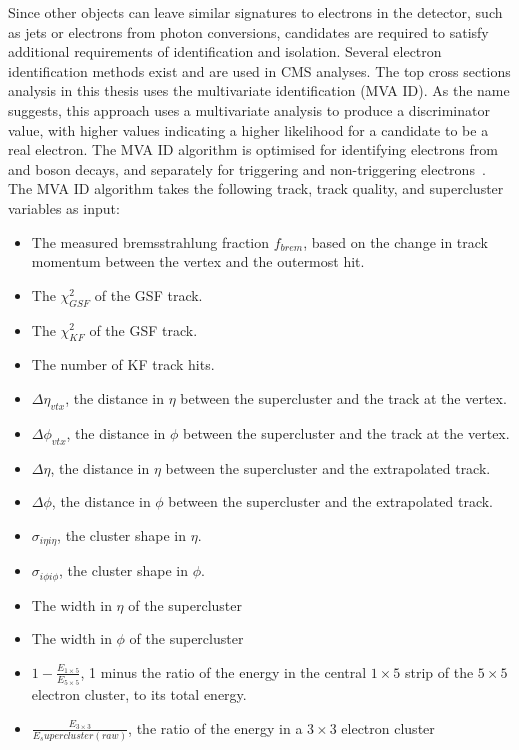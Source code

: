 Since other objects can leave similar signatures to electrons in the detector, such as jets or electrons from
photon conversions, candidates are required to satisfy additional requirements of identification and
isolation. Several electron identification methods exist and are used in CMS analyses. The top cross sections
analysis in this thesis uses the multivariate identification (MVA ID). As the name suggests, this approach
uses a multivariate analysis to produce a discriminator value, with higher values indicating a higher
likelihood for a candidate to be a real electron. The MVA ID algorithm is optimised for identifying electrons
from \W and \Z boson decays, and separately for triggering and non-triggering
electrons~\cite{electron_reconstruction}. The MVA ID algorithm takes the following track, track quality, and
supercluster variables as input:
\begin{itemize}
  \item The measured bremsstrahlung fraction $f_{brem}$, based on the change in track momentum between the
  vertex and the outermost hit.
  \item The $\chi^{2}_{GSF}$ of the GSF track.
  \item The $\chi^{2}_{KF}$ of the GSF track.
  \item The number of KF track hits.
  \item $\Delta\eta_{vtx}$, the distance in $\eta$ between the supercluster and the track at the vertex.
  \item $\Delta\phi_{vtx}$, the distance in $\phi$ between the supercluster and the track at the vertex.
  \item $\Delta\eta$, the distance in $\eta$ between the supercluster and the extrapolated track.
  \item $\Delta\phi$, the distance in $\phi$ between the supercluster and the extrapolated track.
  \item $\sigma_{i\eta i\eta}$, the cluster shape in $\eta$. 
  \item $\sigma_{i\phi i\phi}$, the cluster shape in $\phi$.
  \item The width in $\eta$ of the supercluster
  \item The width in $\phi$ of the supercluster
  \item $1-\frac{E_{1\times5}}{E_{5\times5}}$, 1 minus the ratio of the energy in the central $1\times5$ strip
  of the $5\times5$ electron cluster, to its total energy. 
  \item $\frac{E_{3\times3}}{E_supercluster(raw)}$, the ratio of the energy in a $3\times3$ electron cluster

\end{itemize}
